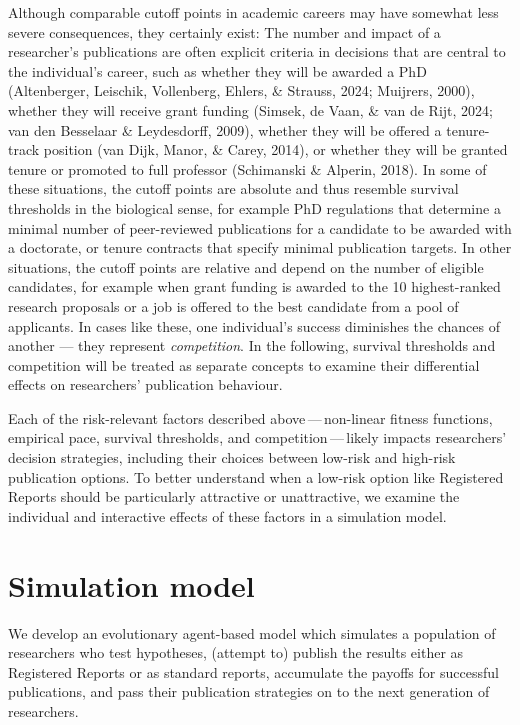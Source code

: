 \documentclass[
  ,man,mask,floatsintext]{apa6}
\begin{document}
Although comparable cutoff points in academic careers may have somewhat less severe consequences, they certainly exist:
The number and impact of a researcher's publications are often explicit criteria in decisions that are central to the individual's career, such as whether they will be awarded a PhD (Altenberger, Leischik, Vollenberg, Ehlers, \& Strauss, 2024; Muijrers, 2000), whether they will receive grant funding (Simsek, de Vaan, \& van de Rijt, 2024; van den Besselaar \& Leydesdorff, 2009), whether they will be offered a tenure-track position (van Dijk, Manor, \& Carey, 2014), or whether they will be granted tenure or promoted to full professor (Schimanski \& Alperin, 2018).
In some of these situations, the cutoff points are absolute and thus resemble survival thresholds in the biological sense, for example PhD regulations that determine a minimal number of peer-reviewed publications for a candidate to be awarded with a doctorate, or tenure contracts that specify minimal publication targets.
In other situations, the cutoff points are relative and depend on the number of eligible candidates, for example when grant funding is awarded to the 10 highest-ranked research proposals or a job is offered to the best candidate from a pool of applicants.
In cases like these, one individual's success diminishes the chances of another --- they represent \emph{competition}.
In the following, survival thresholds and competition will be treated as separate concepts to examine their differential effects on researchers' publication behaviour.

Each of the risk-relevant factors described above\(\,\)---\(\,\)non-linear fitness functions, empirical pace, survival thresholds, and competition\(\,\)---\(\,\)likely impacts researchers' decision strategies, including their choices between low-risk and high-risk publication options.
To better understand when a low-risk option like Registered Reports should be particularly attractive or unattractive, we examine the individual and interactive effects of these factors in a simulation model.

\hypertarget{simulation-model}{%
\section{Simulation model}\label{simulation-model}}

We develop an evolutionary agent-based model which simulates a population of researchers who test hypotheses, (attempt to) publish the results either as Registered Reports or as standard reports, accumulate the payoffs for successful publications, and pass their publication strategies on to the next generation of researchers.
\end{document}
